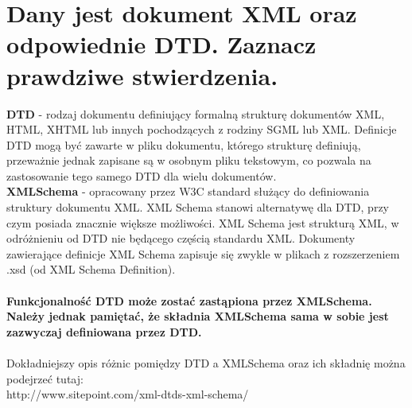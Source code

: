 \vspace{0.4cm}
\noindent

\section{Dany jest dokument XML oraz odpowiednie DTD. Zaznacz prawdziwe stwierdzenia.}


\textbf{DTD} -  rodzaj dokumentu definiujący formalną strukturę dokumentów XML, HTML, XHTML lub innych
 pochodzących z rodziny SGML lub XML. Definicje DTD mogą być zawarte w pliku dokumentu, którego strukturę definiują, przeważnie jednak zapisane są w osobnym pliku tekstowym, co pozwala na zastosowanie tego samego DTD dla wielu dokumentów.\\

\textbf{XMLSchema} - opracowany przez W3C standard służący do definiowania struktury dokumentu XML. XML Schema stanowi alternatywę dla DTD, przy czym posiada znacznie większe możliwości. XML Schema jest strukturą XML, w odróżnieniu od DTD nie będącego częścią standardu XML. Dokumenty zawierające definicje XML Schema zapisuje się zwykle w plikach z rozszerzeniem .xsd (od XML Schema Definition).
\\
\\
\textbf{Funkcjonalność DTD może zostać zastąpiona przez XMLSchema. Należy jednak pamiętać, że składnia XMLSchema sama w sobie jest zazwyczaj definiowana przez DTD.}\\
\\
Dokładniejszy opis różnic pomiędzy DTD a XMLSchema oraz ich składnię można podejrzeć tutaj:\\
http://www.sitepoint.com/xml-dtds-xml-schema/
